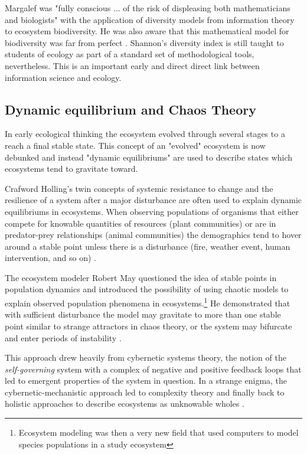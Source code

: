 Margalef was "fully conscious ... of the risk of displeasing both mathematicians and biologists" with the application of diversity models from information theory to ecosystem biodiversity. He was also aware that this mathematical model for biodiversity was far from perfect \citep{margalef_1957}. Shannon's diversity index is still taught to students of ecology as part of a standard set of methodological tools, nevertheless. This is an important early and direct direct link between information science and ecology.

\subsection{Dynamic equilibrium and Chaos Theory}

In early ecological thinking the ecosystem evolved through several stages to a reach a final stable state. This concept of an "evolved" ecosystem is now debunked and instead "dynamic equilibriums" are used to describe states which ecosystems tend to gravitate toward. 

Crafword Holling's twin concepts of systemic resistance to change and the resilience of a system after a major disturbance are often used to explain dynamic equilibriums in ecosystems. When observing populations of organisms that either compete for knowable quantities of resources (plant communities) or are in predator-prey relationships (animal communities) the demographics tend to hover around a stable point unless there is a disturbance (fire, weather event, human intervention, and so on) \citep{holling_1973}. 

The ecosystem modeler Robert May questioned the idea of stable points in population dynamics and introduced the possibility of using chaotic models to explain observed population phenomena in ecosystems.\footnote{Ecosystem modeling was then a very new field that used computers to model species populations in a study ecosystem} He demonstrated that with sufficient disturbance the model may gravitate to more than one stable point similar to strange attractors in chaos theory, or the system may bifurcate and enter periods of instability \citep{may_1974}. 

This approach drew heavily from cybernetic systems theory, the notion of the \textit{self-governing} system with a complex of negative and positive feedback loops that led to emergent properties of the system in question. In a strange enigma, the cybernetic-mechanistic approach led to complexity theory and finally back to holistic approaches to describe ecosystems as unknowable wholes \citep{barbour_1996}.

